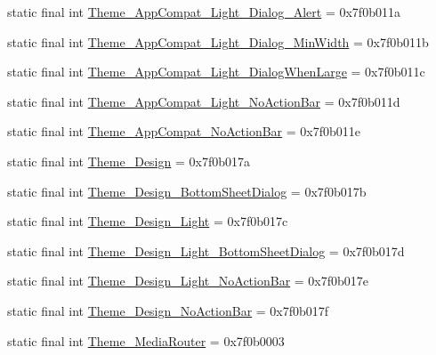\begin{CompactItemize}
\item 
static final int \hyperlink{classandroid_1_1support_1_1v7_1_1recyclerview_1_1_r_1_1style_790f04bd50cf4382b1c57135c44011b2}{Theme\_\-AppCompat\_\-Light\_\-Dialog\_\-Alert} = 0x7f0b011a
\item 
static final int \hyperlink{classandroid_1_1support_1_1v7_1_1recyclerview_1_1_r_1_1style_b567912238151cc73666dabb67ee43ec}{Theme\_\-AppCompat\_\-Light\_\-Dialog\_\-MinWidth} = 0x7f0b011b
\item 
static final int \hyperlink{classandroid_1_1support_1_1v7_1_1recyclerview_1_1_r_1_1style_a16699c8ade691c1a19590ae66ad1f2b}{Theme\_\-AppCompat\_\-Light\_\-DialogWhenLarge} = 0x7f0b011c
\item 
static final int \hyperlink{classandroid_1_1support_1_1v7_1_1recyclerview_1_1_r_1_1style_5c1909c2f92e1c41305876cdb9943f52}{Theme\_\-AppCompat\_\-Light\_\-NoActionBar} = 0x7f0b011d
\item 
static final int \hyperlink{classandroid_1_1support_1_1v7_1_1recyclerview_1_1_r_1_1style_2efb16ad31fbaa650997414419cb066a}{Theme\_\-AppCompat\_\-NoActionBar} = 0x7f0b011e
\item 
static final int \hyperlink{classandroid_1_1support_1_1v7_1_1recyclerview_1_1_r_1_1style_af2f1027ac0911168e8f4a0a33de8dda}{Theme\_\-Design} = 0x7f0b017a
\item 
static final int \hyperlink{classandroid_1_1support_1_1v7_1_1recyclerview_1_1_r_1_1style_01f4105b3e8f8b2c32aee3455847b5fe}{Theme\_\-Design\_\-BottomSheetDialog} = 0x7f0b017b
\item 
static final int \hyperlink{classandroid_1_1support_1_1v7_1_1recyclerview_1_1_r_1_1style_aa8938ac4fe92dc52aa1faa01aad43c2}{Theme\_\-Design\_\-Light} = 0x7f0b017c
\item 
static final int \hyperlink{classandroid_1_1support_1_1v7_1_1recyclerview_1_1_r_1_1style_9f80c010602ece2467aea524ed95c00f}{Theme\_\-Design\_\-Light\_\-BottomSheetDialog} = 0x7f0b017d
\item 
static final int \hyperlink{classandroid_1_1support_1_1v7_1_1recyclerview_1_1_r_1_1style_d770f6d47c2ca050331f09d075f28faa}{Theme\_\-Design\_\-Light\_\-NoActionBar} = 0x7f0b017e
\item 
static final int \hyperlink{classandroid_1_1support_1_1v7_1_1recyclerview_1_1_r_1_1style_a2b95b7dae042eae2c177c2ce96af4e4}{Theme\_\-Design\_\-NoActionBar} = 0x7f0b017f
\item 
static final int \hyperlink{classandroid_1_1support_1_1v7_1_1recyclerview_1_1_r_1_1style_73039cb41fcc3a17f8dc3e06a6fa55d6}{Theme\_\-MediaRouter} = 0x7f0b0003

\end{CompactItemize}
